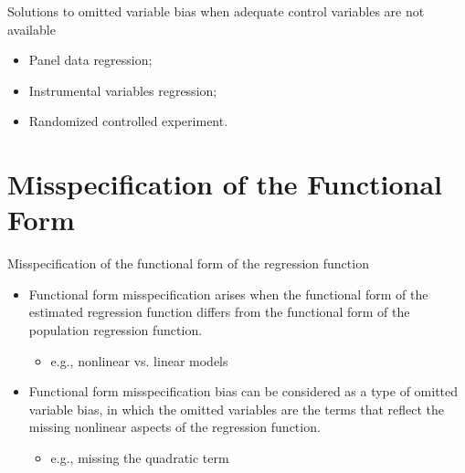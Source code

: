 \documentclass[presentation,10pt]{beamer}
\begin{document}
\begin{frame}[label={sec:orgd31d2c9}]{Solutions to omitted variable bias when adequate control variables are not available}
\begin{itemize}
\item Panel data regression;
\item Instrumental variables regression;
\item Randomized controlled experiment.
\end{itemize}
\end{frame}

\section{Misspecification of the Functional Form}
\label{sec:orgfcac74a}

\begin{frame}[label={sec:org04cfe82}]{Misspecification of the functional form of the regression function}
\begin{itemize}
\item Functional form misspecification arises when the functional form of
the estimated regression function differs from the functional form of
the population regression function. 
\begin{itemize}
\item e.g., nonlinear vs. linear models
\end{itemize}
\end{itemize}

\vspace{0.1cm}

\begin{itemize}
\item Functional form misspecification bias can be considered as a type of
omitted variable bias, in which the omitted variables are the terms
that reflect the missing nonlinear aspects of the regression
function. 
\begin{itemize}
\item e.g., missing the quadratic term
\end{itemize}
\end{itemize}
\end{frame}
\end{document}
